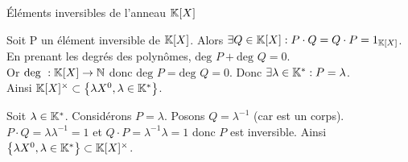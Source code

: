 \documentclass{article}
\date{10 Mars 2024}
\begin{document}
\maketitle

\begin{question_kholle}
	[{\begin{equation}
					\K[X] ^\times = \left\{ \lambda X^0, \lambda \in \K^* \right\}
				\end{equation}}]
	{Éléments inversibles de l'anneau $\mathbb K[X]$}

	Soit P un élément inversible de $\mathbb K[X]$.
	Alors $\exists Q \in \mathbb K[X] : P \cdot Q = Q \cdot P = 1_{\mathbb K[X]}$.
	En prenant les degrés des polynômes, $\text{deg } P + \text{deg } Q = 0$. \\
	Or $\text{deg } : \mathbb K[X] \rightarrow \mathbb N$ donc $\text{deg } P = \text{deg } Q = 0$.
	Donc $\exists \lambda \in \mathbb K^* : P = \lambda$. \\
	Ainsi $\mathbb K[X]^\times \subset \left\{ \lambda X^0, \lambda \in \mathbb K^* \right\}$.

	Soit $\lambda \in \mathbb K^*$. Considérons $P = \lambda$.
	Posons $Q = \lambda^{-1}$ (car \K est un corps). $P \cdot Q = \lambda \lambda^{-1} = 1$ et $Q \cdot P = \lambda^{-1} \lambda = 1$ donc $P$ est inversible. Ainsi $\left\{ \lambda X^0, \lambda \in \mathbb K^* \right\} \subset \mathbb K[X]^\times$.
\end{question_kholle}
\end{document}

